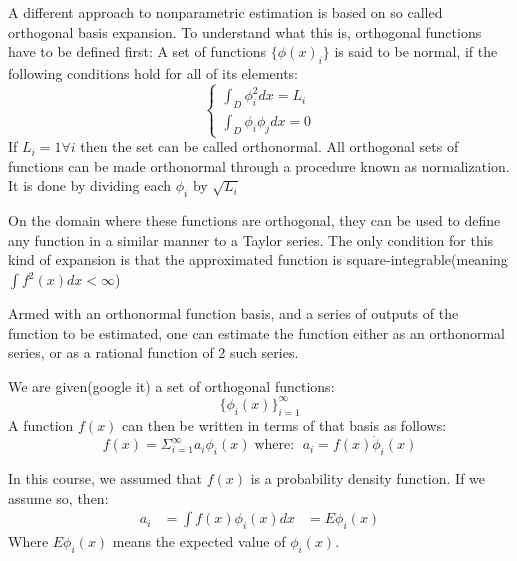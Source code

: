 {

    A different approach to nonparametric estimation is based on so called orthogonal basis expansion. To understand what this is, orthogonal functions have to be defined first:
    {
        A set of functions $\{\phi(x)_i\}$ is said to be normal, if the following conditions hold for all of its elements:
        \begin{equation}
            
            \begin{cases}
                \int_D\phi_i^{2}dx = L_i\\
                \int_D\phi_i\phi_j dx = 0
            \end{cases}
        \end{equation}
        If $L_i = 1 \forall i $ then the set can be called orthonormal.
        All orthogonal sets of functions can be made orthonormal through a procedure known as normalization. It is done by dividing each $\phi_i$ by  $\sqrt{L_i}$
    }




  On the domain where these functions are orthogonal, they can be used to define any function in a similar manner to a Taylor series. The only condition for this kind of expansion is that the approximated function is square-integrable(meaning $\int f^{2}(x)dx < \infty$)

  Armed with an orthonormal function basis, and a series of outputs of the function to be estimated, one can estimate the function either as an orthonormal series, or as a rational function of 2 such series.

{
    We are given(google it) a set of orthogonal functions:
    \begin{equation}
        \{\phi_i(x)\}^{\infty}_{i=1}
    \end{equation}
    A function $f(x)$ can then be written in terms of that basis as follows:
     \begin{equation}
         f(x) = \Sigma_{i=1}^{\infty} a_i\phi_i(x)\;\text{where: }\; a_i = f(x) \dot\phi_i(x)
    \end{equation}

    In this course, we assumed that $f(x)$ is a probability density function. If we assume so, then:
    \begin{equation}
        \begin{aligned}
            a_i &= \int f(x)\phi_i(x)dx &= E\phi_i(x)
        \end{aligned}
    \end{equation}
    Where $E\phi_i(x)$ means the expected value of $\phi_i(x)$.
}

}

